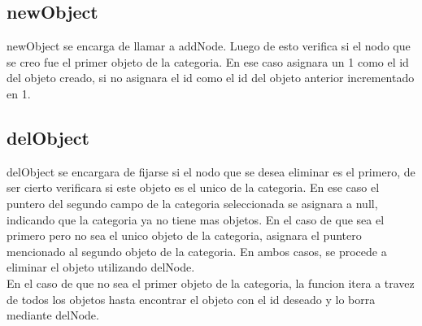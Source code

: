 \documentclass[]{article}
\begin{document}
\subsection{newObject}
newObject se encarga de llamar a addNode. Luego de esto verifica si el nodo que se creo fue el primer objeto de la categoria. En ese caso asignara un 1 como el id del objeto creado, si no asignara el id como el id del objeto anterior incrementado en 1.
\\
\subsection{delObject}
delObject se encargara de fijarse si el nodo que se desea eliminar es el primero, de ser cierto verificara si este objeto es el unico de la categoria. En ese caso el puntero del segundo campo de la categoria seleccionada se asignara a null, indicando que la categoria ya no tiene mas objetos. En el caso de que sea el primero pero no sea el unico objeto de la categoria, asignara el puntero mencionado al segundo objeto de la categoria. En ambos casos, se procede a eliminar el objeto utilizando delNode. \\

En el caso de que no sea el primer objeto de la categoria, la funcion itera a travez de todos los objetos hasta encontrar el objeto con el id deseado y lo borra mediante delNode. \\
\end{document}

